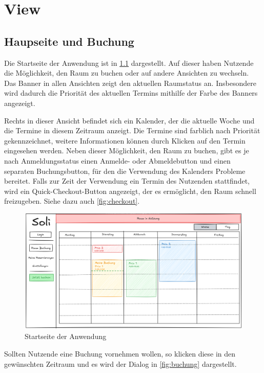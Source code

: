
\chapter{View}
\label{ch:view}


\section{Haupseite und Buchung}

Die Startseite der Anwendung ist in \ref{fig:startseite} dargestellt.
Auf dieser haben Nutzende die Möglichkeit, den Raum zu buchen oder auf andere Ansichten zu wechseln.
Das Banner in allen Ansichten zeigt den aktuellen Raumstatus an.
Insbesondere wird dadurch die Priorität des aktuellen Termins mithilfe der Farbe des Banners angezeigt.

Rechts in dieser Ansicht befindet sich ein Kalender, der die aktuelle Woche und die Termine in diesem Zeitraum anzeigt.
Die Termine sind farblich nach Priorität gekennzeichnet, weitere Informationen können durch Klicken auf den Termin eingesehen werden.
Neben dieser Möglichkeit, den Raum zu buchen, gibt es je nach Anmeldungsstatus einen Anmelde- oder Abmeldebutton und einen separaten Buchungsbutton,
für den die Verwendung des Kalenders Probleme bereitet.
Falls zur Zeit der Verwendung ein Termin des Nutzenden stattfindet, wird ein Quick-Checkout-Button angezeigt,
der es ermöglicht, den Raum schnell freizugeben.
Siehe dazu auch \ref{fig:checkout}.

\begin{figure}[ht]
    \centering
    \includegraphics[width=\textwidth]{figures/ui/startseite}
    \caption{Startseite der Anwendung}
    \label{fig:startseite}
\end{figure}
\pagebreak

Sollten Nutzende eine Buchung vornehmen wollen, so klicken diese in den gewünschten Zeitraum
und es wird der Dialog in \ref{fig:buchung} dargestellt.

